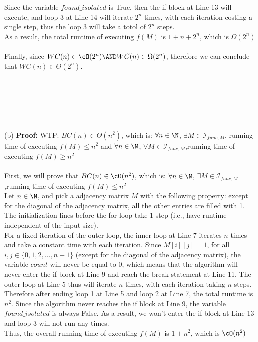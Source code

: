 \documentclass[12pt]{article}
\begin{document}
Since the variable $found\_isolated$ is True, then the if block at Line 13 will execute, and loop 3 at Line 14 will iterate $2^n$ times, with each iteration costing a single step, thus the loop 3 will take a totol of $2^n$ steps.\\
As a result, the total runtime of executing $f(M)$ is $1+n+2^n$, which is $\Omega(2^n)$\\
\\
Finally, since $WC(n) \in \cO(2^n) \AND WC(n) \in \Omega(2^n)$, therefore we can conclude that $WC(n) \in \Theta(2^n)$.\\
\\
\\
\\
\\
\\
\\
(b) \textbf{Proof:} WTP: $BC(n) \in \Theta(n^2)$, which is: $\forall n \in \N$, $\exists M \in \mathcal{I}_{func,M}$, running time of executing $f(M) \le n^2$ and $\forall n \in \N$, $\forall M \in \mathcal{I}_{func,M}$,running time of executing $f(M) \ge n^2$\\
\\
First, we will prove that $BC(n) \in \cO(n^2)$, which is: $\forall n \in \N$, $\exists M \in \mathcal{I}_{func,M}$,running time of executing $f(M) \le n^2$\\
Let $n \in \N$, and pick a adjacency matrix $M$ with the following property:  except for the diagonal of the adjacency matrix, all the other entries are filled with 1.\\
The initialization lines before the for loop take 1 step (i.e., have runtime independent of the input size).\\
For a fixed iteration of the outer loop, the inner loop at Line 7 iterates $n$ times and take a constant time with each iteration. Since $M[i][j] = 1$, for all $i, j\in \{0, 1, 2,..., n-1\}$ (except for the diagonal of the adjacency matrix), the variable $count$ will never be equal to 0, which means that the algorithm will never enter the if block at Line 9 and reach the break statement at Line 11. The outer loop at Line 5 thus will iterate $n$ times, with each iteration taking $n$ steps. Therefore after ending loop 1 at Line 5 and loop 2 at Line 7, the total runtime is $n^2$. Since the algorithm never reaches the if block at Line 9, the variable $found\_isolated$ is always False. As a result, we won't enter the if block at Line 13 and loop 3 will not run any times.\\
Thus, the overall running time of executing $f(M)$ is $1+n^2$, which is $\cO(n^2)$\\
\end{document}
